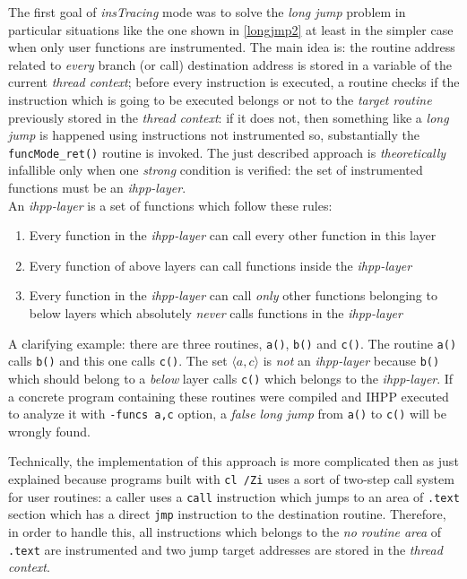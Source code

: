 \documentclass[a4paper,10pt]{report}
\begin{document}
The first goal of \emph{insTracing} mode was to solve the \emph{long jump} 
problem in particular situations like the one shown in \cref{longjmp2} 
at least in the simpler case when only user functions are instrumented. 
The main idea is: the routine address related to \emph{every} branch (or call) 
destination address is stored in a variable of the current \emph{thread context}; 
before every instruction is executed, a routine checks if the instruction
which is going to be executed belongs or not to the \emph{target routine} 
previously stored in the \emph{thread context}: if it does not, then something
like a \emph{long jump} is happened using instructions not instrumented so,
substantially the \verb|funcMode_ret()| routine is invoked. The just described 
approach is \emph{theoretically} infallible only when one \emph{strong} condition
is verified: the set of instrumented functions must be an \emph{ihpp-layer}.\\
An \emph{ihpp-layer} is a set of functions which follow these rules:
\begin{enumerate}
\item Every function in the \emph{ihpp-layer} can call every other function in this layer
\item Every function of above layers can call functions inside the \emph{ihpp-layer}
\item Every function in the \emph{ihpp-layer} can call \emph{only} other functions
belonging to below layers which absolutely \emph{never} calls functions
in the \emph{ihpp-layer}
\end{enumerate}

\noindent
A clarifying example: there are three routines, \verb|a()|, \verb|b()| and \verb|c()|.
The routine \verb|a()| calls \verb|b()| and this one calls \verb|c()|.
The set $\langle a,c\rangle$ is \emph{not} an \emph{ihpp-layer} because \verb|b()| which should belong to a \emph{below} layer calls \verb|c()| which belongs to the \emph{ihpp-layer}. If a concrete program containing these routines were compiled and IHPP executed
to analyze it with \verb|-funcs a,c| option, a \emph{false} \emph{long jump} from 
\verb|a()| to \verb|c()| will be wrongly found.

Technically, the implementation of this approach is more complicated then
as just explained because programs built with \verb|cl /Zi| uses
a sort of two-step call system for user routines: 
a caller uses a \verb|call| instruction which jumps to 
an area of \verb|.text| section which has a direct \verb|jmp| instruction
to the destination routine. Therefore, in order to handle this, all
instructions which belongs to the \emph{no routine area} of \verb|.text| are instrumented
and two jump target addresses are stored in the \emph{thread context}.
\end{document}
